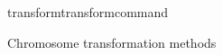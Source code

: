 \begin{command}{transform}{transformcommand}
\begin{arguments}
\begin{argumentgroup}{Chromosome transformation methods}
\begin{description}
                           




\end{description}
\end{argumentgroup}
\end{arguments}
\end{command}
